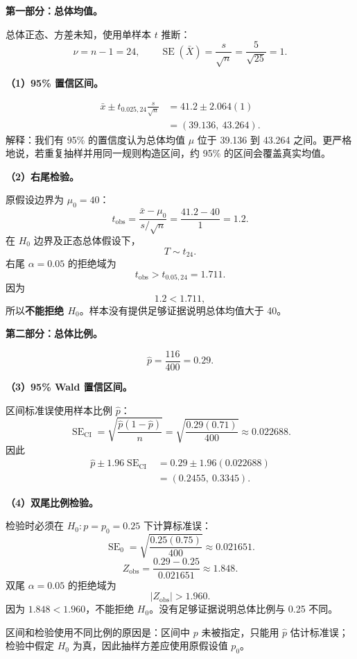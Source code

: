 \documentclass[11pt,a4paper]{article}
\newcommand{\SE}{\operatorname{SE}}
\begin{document}
\begin{solutionbox}
\textbf{第一部分：总体均值。}

总体正态、方差未知，使用单样本 $t$ 推断：
\[
  \nu=n-1=24,
  \qquad
  \SE(\bar X)=\frac{s}{\sqrt n}=\frac5{\sqrt{25}}=1.
\]

\textbf{（1）95\% 置信区间。}

\[
\begin{aligned}
  \bar x
  \pm
  t_{0.025,24}\frac{s}{\sqrt n}
  &=
  41.2\pm2.064(1)\\
  &=
  \boxed{(39.136,\ 43.264)}.
\end{aligned}
\]
解释：我们有 95\% 的置信度认为总体均值 $\mu$ 位于 39.136 到 43.264 之间。更严格地说，若重复抽样并用同一规则构造区间，约 95\% 的区间会覆盖真实均值。

\textbf{（2）右尾检验。}

原假设边界为 $\mu_0=40$：
\[
  t_{\mathrm{obs}}
  =
  \frac{\bar x-\mu_0}{s/\sqrt n}
  =
  \frac{41.2-40}{1}
  =
  1.2.
\]
在 $H_0$ 边界及正态总体假设下，
\[
  T\sim t_{24}.
\]
右尾 $\alpha=0.05$ 的拒绝域为
\[
  t_{\mathrm{obs}}>t_{0.05,24}=1.711.
\]
因为
\[
  1.2<1.711,
\]
所以\textbf{不能拒绝 $H_0$}。样本没有提供足够证据说明总体均值大于 40。

\textbf{第二部分：总体比例。}

\[
  \hat p=\frac{116}{400}=0.29.
\]

\textbf{（3）95\% Wald 置信区间。}

区间标准误使用样本比例 $\hat p$：
\[
  \SE_{\mathrm{CI}}
  =
  \sqrt{\frac{\hat p(1-\hat p)}n}
  =
  \sqrt{\frac{0.29(0.71)}{400}}
  \approx0.022688.
\]
因此
\[
\begin{aligned}
  \hat p\pm1.96\SE_{\mathrm{CI}}
  &=
  0.29\pm1.96(0.022688)\\
  &=
  \boxed{(0.2455,\ 0.3345)}.
\end{aligned}
\]

\textbf{（4）双尾比例检验。}

检验时必须在 $H_0:p=p_0=0.25$ 下计算标准误：
\[
  \SE_0
  =
  \sqrt{\frac{0.25(0.75)}{400}}
  \approx0.021651.
\]
\[
  Z_{\mathrm{obs}}
  =
  \frac{0.29-0.25}{0.021651}
  \approx1.848.
\]
双尾 $\alpha=0.05$ 的拒绝域为
\[
  |Z_{\mathrm{obs}}|>1.960.
\]
因为 $1.848<1.960$，不能拒绝 $H_0$。没有足够证据说明总体比例与 0.25 不同。

区间和检验使用不同比例的原因是：区间中 $p$ 未被指定，只能用 $\hat p$ 估计标准误；检验中假定 $H_0$ 为真，因此抽样方差应使用原假设值 $p_0$。
\end{solutionbox}
\end{document}
